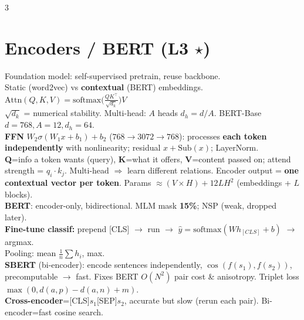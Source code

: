 \documentclass[12pt]{extarticle} %
\newcommand{\sub}[1]{\textcolor{key}{\textbf{#1}}}
\newcommand{\fb}[1]{\colorbox{yellow!30}{$#1$}} %
\begin{document}
\begin{multicols}{3}
\section{Encoders / BERT \textnormal{(L3 \(\star\))}}
Foundation model: self-supervised pretrain, reuse backbone.\\
Static (word2vec) vs \sub{contextual} (BERT) embeddings.\\
\fb{\text{Attn}(Q,K,V)=\text{softmax}\!\big(\tfrac{QK^\top}{\sqrt{d_k}}\big)V}\\
$\sqrt{d_k}$ = numerical stability. Multi-head: $A$ heads $d_h=d/A$. BERT-Base $d{=}768,A{=}12,d_h{=}64$.\\
\sub{FFN} $W_2\sigma(W_1x{+}b_1){+}b_2$ ($768\!\to\!3072\!\to\!768$): processes \sub{each token independently} with nonlinearity; residual $x{+}\text{Sub}(x)$; LayerNorm.\\
\sub{Q}=info a token wants (query), \sub{K}=what it offers, \sub{V}=content passed on; attend strength = $q_i\!\cdot\!k_j$. Multi-head $\Rightarrow$ learn different relations. Encoder output = \sub{one contextual vector per token}. Params $\approx (V\!\times\!H)+12LH^2$ (embeddings + $L$ blocks).\\
\sub{BERT}: encoder-only, bidirectional. MLM mask \textbf{15\%}; NSP (weak, dropped later).\\
\sub{Fine-tune classif:} prepend [CLS] $\to$ run $\to$ $\hat y=\text{softmax}(Wh_{[CLS]}{+}b)$ $\to$ argmax.\\
Pooling: mean $\tfrac1n\sum h_i$, max.\\
\sub{SBERT} (bi-encoder): encode sentences independently, $\cos(f(s_1),f(s_2))$, precomputable $\to$ fast. Fixes BERT $O(N^2)$ pair cost \& anisotropy. Triplet loss $\max(0,d(a,p){-}d(a,n){+}m)$.\\
\sub{Cross-encoder}=[CLS]$s_1$[SEP]$s_2$, accurate but slow (rerun each pair). Bi-encoder=fast cosine search.


\end{multicols}
\end{document}
